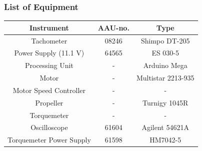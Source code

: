 \subsubsection{List of Equipment}
\begin{table}[H]
    \centering
	\begin{tabular}{|c|c|c|}
		\hline%
		\textbf{Instrument}                                  &  \textbf{AAU-no.}  &  \textbf{Type}                       \\
		\hline%
		Tachometer                                           &  08246           &  Shimpo DT-205		                   \\
		\hline%
	    Power Supply (11.1 V) &  64565                   &  ES 030-5                 \\
		\hline%
		Processing Unit                                   &  -               & Arduino Mega     \\
		\hline%
		Motor                                         &  -               & Multistar 2213-935     \\
		\hline%
		Motor Speed Controller                                   &  -               &  -      \\
		\hline%
		Propeller                                   &  -              & Turnigy 1045R     \\
		\hline%
		Torquemeter                                   & -              & -     \\
		\hline%
		Oscilloscope                                   & 61604               & Agilent 54621A     \\
		\hline%
		Torquemeter Power Supply                   &  61598              & HM7042-5    \\
		\hline%
		
	\end{tabular}
\end{table}

